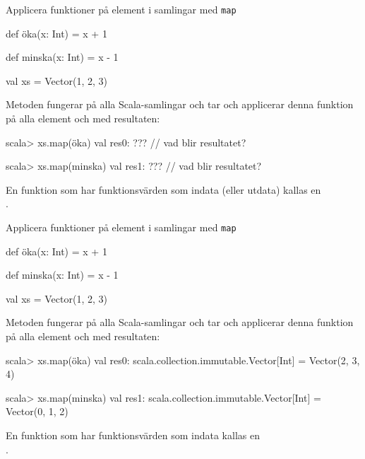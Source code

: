 \begin{Slide}{Applicera funktioner på element i samlingar med \texttt{map}}\SlideFontSmall
\begin{Code}
def öka(x: Int) = x + 1

def minska(x: Int) = x - 1

val xs = Vector(1, 2, 3)
\end{Code}
\pause
Metoden  fungerar på alla Scala-samlingar och tar  och applicerar denna funktion på alla element och  med resultaten:
\begin{REPL}
scala> xs.map(öka)
val res0: ???   // vad blir resultatet?

scala> xs.map(minska)
val res1: ???   // vad blir resultatet?
\end{REPL}
En funktion som har funktionsvärden som indata (eller utdata) kallas en\\   .
\end{Slide}


\begin{Slide}{Applicera funktioner på element i samlingar med \texttt{map}}\SlideFontSmall
\begin{Code}
def öka(x: Int) = x + 1

def minska(x: Int) = x - 1

val xs = Vector(1, 2, 3)
\end{Code}
Metoden  fungerar på alla Scala-samlingar och tar  och applicerar denna funktion på alla element och  med resultaten:
\begin{REPL}
scala> xs.map(öka)
val res0: scala.collection.immutable.Vector[Int] = Vector(2, 3, 4)

scala> xs.map(minska)
val res1: scala.collection.immutable.Vector[Int] = Vector(0, 1, 2)
\end{REPL}
En funktion som har funktionsvärden som indata kallas en\\   .
\end{Slide}


